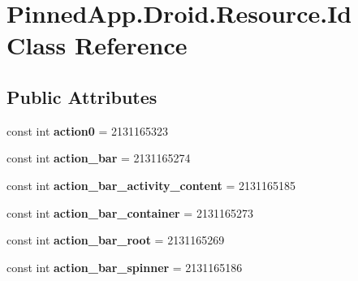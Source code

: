 \hypertarget{class_pinned_app_1_1_droid_1_1_resource_1_1_id}{}\section{Pinned\+App.\+Droid.\+Resource.\+Id Class Reference}
\label{class_pinned_app_1_1_droid_1_1_resource_1_1_id}
\subsection*{Public Attributes}
\begin{DoxyCompactItemize}
\item 
\mbox{\label{class_pinned_app_1_1_droid_1_1_resource_1_1_id_a224aba7c7101c5946b221ad736cd38b7}} 
const int {\bfseries action0} = 2131165323
\item 
\mbox{\label{class_pinned_app_1_1_droid_1_1_resource_1_1_id_a57172a3e6bd880f1084b38e147e05708}} 
const int {\bfseries action\+\_\+bar} = 2131165274
\item 
\mbox{\label{class_pinned_app_1_1_droid_1_1_resource_1_1_id_a4b1d061d31c2be7984bab95d6c26699f}} 
const int {\bfseries action\+\_\+bar\+\_\+activity\+\_\+content} = 2131165185
\item 
\mbox{\label{class_pinned_app_1_1_droid_1_1_resource_1_1_id_aa91331ccf5195ad437fd57e459ce076a}} 
const int {\bfseries action\+\_\+bar\+\_\+container} = 2131165273
\item 
\mbox{\label{class_pinned_app_1_1_droid_1_1_resource_1_1_id_a40c3260e7cc482e910b0cb7b89824b20}} 
const int {\bfseries action\+\_\+bar\+\_\+root} = 2131165269
\item 
\mbox{\label{class_pinned_app_1_1_droid_1_1_resource_1_1_id_a628b173af1692d8281816ec0217bfbe1}} 
const int {\bfseries action\+\_\+bar\+\_\+spinner} = 2131165186
\item 
\mbox{\label{class_pinned_app_1_1_droid_1_1_resource_1_1_id_a581d80a279bfb345a3fd979419a37a4a}} 

\end{DoxyCompactItemize}
